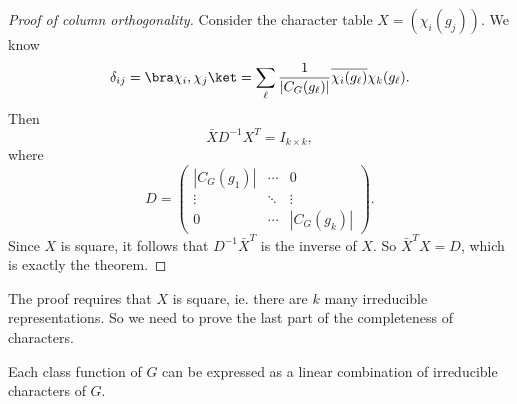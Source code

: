 \documentclass[a4paper]{article}
\begin{document}
\begin{proof}[Proof of column orthogonality]
  Consider the character table $X = (\chi_i(g_j))$. We know
  \[
    \delta_{ij} = \bra \chi_i, \chi_j\ket = \sum_\ell \frac{1}{|C_G(g_\ell)|}\overline{\chi_i(g_\ell)} \chi_k(g_\ell).
  \]
  Then
  \[
    \bar{X} D^{-1} X^T = I_{k\times k},
  \]
  where
  \[
    D =
    \begin{pmatrix}
      |C_G(g_1)| & \cdots & 0\\
      \vdots & \ddots & \vdots\\
      0 & \cdots & |C_G(g_k)|
    \end{pmatrix}.
  \]
  Since $X$ is square, it follows that $D^{-1} \bar{X}^T$ is the inverse of $X$. So $\bar{X}^T X = D$, which is exactly the theorem.
\end{proof}
The proof requires that $X$ is square, ie. there are $k$ many irreducible representations. So we need to prove the last part of the completeness of characters.

\begin{thm}
  Each class function of $G$ can be expressed as a linear combination of irreducible characters of $G$.
\end{thm}
\end{document}
